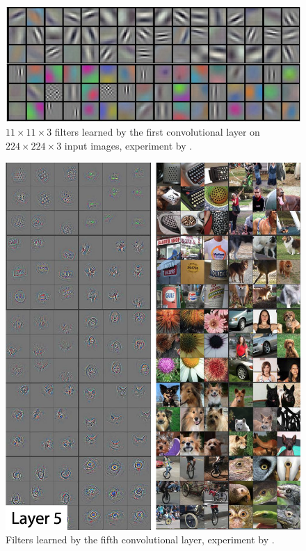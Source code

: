 \begin{figure}[ht]
    \includegraphics[clip,width=1\columnwidth]{Figures/related/kernels.jpeg}
    \caption{ $11 \times 11 \times 3$ filters learned by the first convolutional
        layer on $224 \times 224 \times 3$ input images, experiment by
        \cite{krizhevsky_imagenet_2017-1}. }
    \label{fig:kernels}
\end{figure}

\begin{figure}[htp]
    \includegraphics[clip,width=1\columnwidth]{Figures/related/kernels_5.png}
    \caption{ Filters learned by the fifth convolutional layer, experiment by
        \cite{zeiler_visualizing_2013}. }
    \label{fig:kernels_5}
\end{figure}

